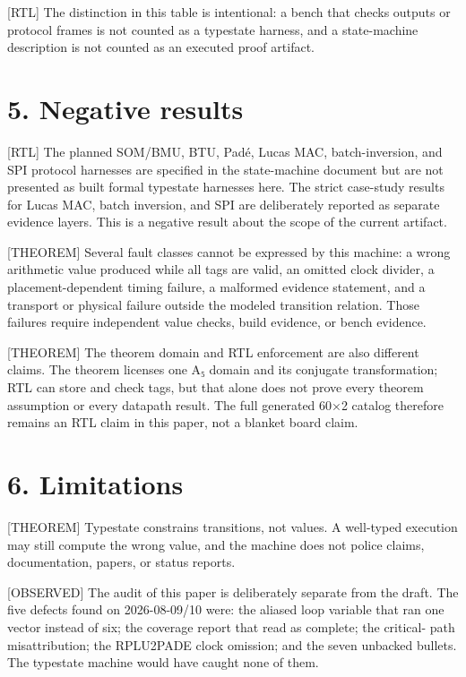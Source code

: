 \documentclass[11pt]{article}
\begin{document}
[RTL] The distinction in this table is intentional: a bench that checks outputs or protocol frames is not counted as a typestate harness, and a state-machine description is not counted as an executed proof artifact.

\section{5. Negative results}

[RTL] The planned SOM/BMU, BTU, Padé, Lucas MAC, batch-inversion, and SPI protocol harnesses are specified in the state-machine document but are not presented as built formal typestate harnesses here. The strict case-study results for Lucas MAC, batch inversion, and SPI are deliberately reported as separate evidence layers. This is a negative result about the scope of the current artifact.

[THEOREM] Several fault classes cannot be expressed by this machine: a wrong arithmetic value produced while all tags are valid, an omitted clock divider, a placement-dependent timing failure, a malformed evidence statement, and a transport or physical failure outside the modeled transition relation. Those failures require independent value checks, build evidence, or bench evidence.

[THEOREM] The theorem domain and RTL enforcement are also different claims. The theorem licenses one A₅ domain and its conjugate transformation; RTL can store and check tags, but that alone does not prove every theorem assumption or every datapath result. The full generated 60×2 catalog therefore remains an RTL claim in this paper, not a blanket board claim.

\section{6. Limitations}

[THEOREM] Typestate constrains transitions, not values. A well-typed execution may still compute the wrong value, and the machine does not police claims, documentation, papers, or status reports.

[OBSERVED] The audit of this paper is deliberately separate from the draft. The five defects found on 2026-08-09/10 were: the aliased loop variable that ran one vector instead of six; the coverage report that read as complete; the critical- path misattribution; the RPLU2PADE clock omission; and the seven unbacked bullets. The typestate machine would have caught none of them.
\end{document}
